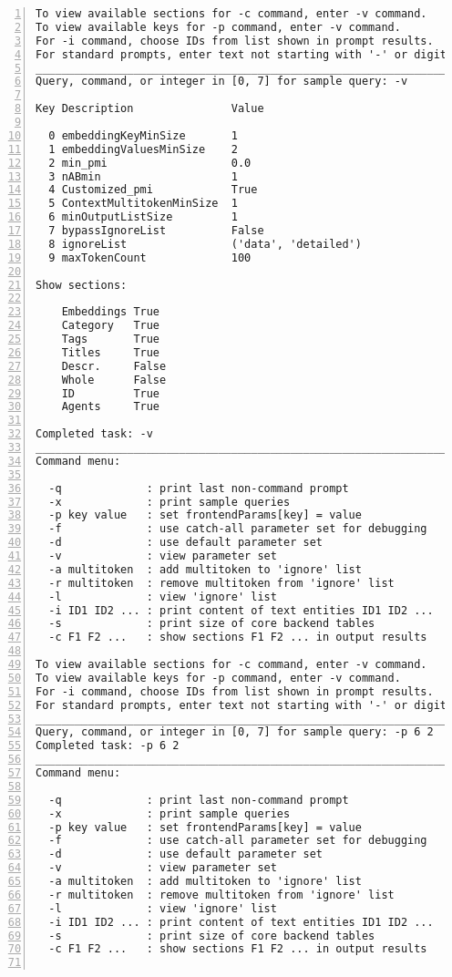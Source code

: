 \documentclass[10pt]{article}
\begin{document}
{\begin{lstlisting}[numbers=left,basicstyle=\ttfamily\footnotesize, frame=none]
To view available sections for -c command, enter -v command.
To view available keys for -p command, enter -v command.
For -i command, choose IDs from list shown in prompt results.
For standard prompts, enter text not starting with '-' or digit.
____________________________________________________________________
Query, command, or integer in [0, 7] for sample query: -v

Key Description               Value

  0 embeddingKeyMinSize       1
  1 embeddingValuesMinSize    2
  2 min_pmi                   0.0
  3 nABmin                    1
  4 Customized_pmi            True
  5 ContextMultitokenMinSize  1
  6 minOutputListSize         1
  7 bypassIgnoreList          False
  8 ignoreList                ('data', 'detailed')
  9 maxTokenCount             100

Show sections:

    Embeddings True
    Category   True
    Tags       True
    Titles     True
    Descr.     False
    Whole      False
    ID         True
    Agents     True

Completed task: -v
____________________________________________________________________
Command menu:

  -q             : print last non-command prompt
  -x             : print sample queries
  -p key value   : set frontendParams[key] = value
  -f             : use catch-all parameter set for debugging
  -d             : use default parameter set
  -v             : view parameter set
  -a multitoken  : add multitoken to 'ignore' list
  -r multitoken  : remove multitoken from 'ignore' list
  -l             : view 'ignore' list
  -i ID1 ID2 ... : print content of text entities ID1 ID2 ...
  -s             : print size of core backend tables
  -c F1 F2 ...   : show sections F1 F2 ... in output results

To view available sections for -c command, enter -v command.
To view available keys for -p command, enter -v command.
For -i command, choose IDs from list shown in prompt results.
For standard prompts, enter text not starting with '-' or digit.
____________________________________________________________________
Query, command, or integer in [0, 7] for sample query: -p 6 2
Completed task: -p 6 2
____________________________________________________________________
Command menu:

  -q             : print last non-command prompt
  -x             : print sample queries
  -p key value   : set frontendParams[key] = value
  -f             : use catch-all parameter set for debugging
  -d             : use default parameter set
  -v             : view parameter set
  -a multitoken  : add multitoken to 'ignore' list
  -r multitoken  : remove multitoken from 'ignore' list
  -l             : view 'ignore' list
  -i ID1 ID2 ... : print content of text entities ID1 ID2 ...
  -s             : print size of core backend tables
  -c F1 F2 ...   : show sections F1 F2 ... in output results


\end{lstlisting}}
\end{document}
